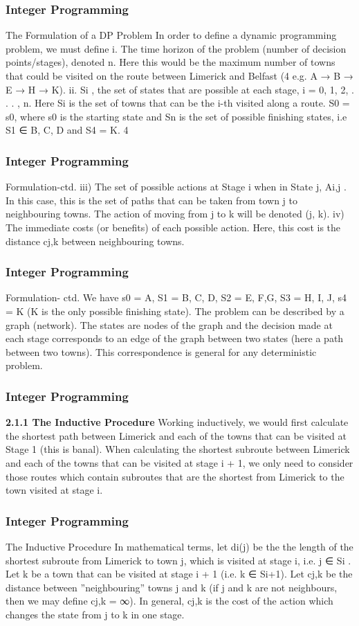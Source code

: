 \begin{frame} 
\frametitle{Integer Programming}     
The Formulation of a DP Problem
In order to define a dynamic programming problem, we must define
i. The time horizon of the problem (number of decision
points/stages), denoted n.
Here this would be the maximum number of towns
that could be visited on the route between Limerick
and Belfast (4 e.g. A → B → E → H → K).
ii. Si
, the set of states that are possible at each stage,
i = 0, 1, 2, . . . , n.
Here Si
is the set of towns that can be the i-th
visited along a route. S0 = {s0}, where s0 is the
starting state and Sn is the set of possible finishing
states, i.e S1 ∈ {B, C, D} and S4 = K.
4 \end{frame}  \begin{frame} \frametitle{Integer Programming}     
Formulation-ctd.
iii) The set of possible actions at Stage i when in State
j, Ai,j
.
In this case, this is the set of paths that can be taken
from town j to neighbouring towns. The action of
moving from j to k will be denoted (j, k).
iv) The immediate costs (or benefits) of each possible
action.
Here, this cost is the distance cj,k between
neighbouring towns.
\end{frame}  
\begin{frame} 
\frametitle{Integer Programming}     
Formulation- ctd.
We have s0 = A, S1 = {B, C, D}, S2 = {E, F,G}, S3 = {H, I, J},
s4 = K (K is the only possible finishing state).
The problem can be described by a graph (network).
The states are nodes of the graph and the decision made at each
stage corresponds to an edge of the graph between two states
(here a path between two towns).
This correspondence is general for any deterministic problem.
\end{frame}  
\begin{frame} 
\frametitle{Integer Programming}     
\noindent \textbf{2.1.1 The Inductive Procedure}
Working inductively, we would first calculate the shortest path
between Limerick and each of the towns that can be visited at
Stage 1 (this is banal).
When calculating the shortest subroute between Limerick and each
of the towns that can be visited at stage i + 1, we only need to
consider those routes which contain subroutes that are the shortest
from Limerick to the town visited at stage i.
\end{frame} 
\begin{frame} 
\frametitle{Integer Programming}     
The Inductive Procedure
In mathematical terms, let di(j) be the the length of the shortest
subroute from Limerick to town j, which is visited at stage i, i.e.
j ∈ Si
.
Let k be a town that can be visited at stage i + 1 (i.e. k ∈ Si+1).
Let cj,k be the distance between ”neighbouring” towns j and k (if
j and k are not neighbours, then we may define cj,k = ∞).
In general, cj,k is the cost of the action which changes the state
from j to k in one stage.
\end{frame}  
